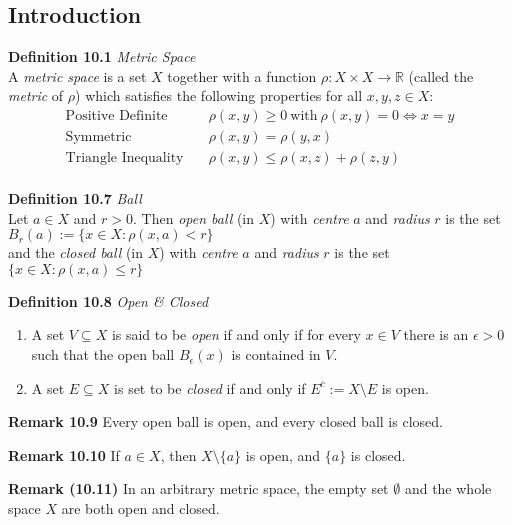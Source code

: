 \documentclass[8pt,landscape]{article}
\begin{document}
\begin{multicols}{3}
\subsection{Introduction}

\textbf{Definition 10.1} \emph{Metric Space} \\
A \emph{metric space} is a set $X$ together with a function
$\rho : X \times X \to \mathbb{R}$ (called the \emph{metric} of $\rho$) which
satisfies the following properties for all $x, y, z \in X$:
\begin{align*}{}
    \text{Positive Definite} \quad & \rho(x, y) \geq 0 \ \text{with} \ \rho(x, y) = 0
    \iff x = y \\
    \text{Symmetric} \quad & \rho(x, y) = \rho(y, x) \\
    \text{Triangle Inequality} \quad & \rho(x, y) \leq \rho(x, z) + \rho(z, y) \\
\end{align*}

\textbf{Definition 10.7} \emph{Ball} \\
Let $a \in X$ and $r > 0$.
Then \emph{open ball} (in $X$) with \emph{centre} $a$ and \emph{radius} $r$ is the set \\
$B_r(a) := \{ x \in X : \rho(x, a) < r \}$ \\
and the \emph{closed ball} (in $X$) with \emph{centre} $a$ and \emph{radius} $r$ is
the set \\
$\{ x \in X : \rho (x, a) \leq r \}$

\textbf{Definition 10.8} \emph{Open \& Closed}
\begin{enumerate}
    \item A set $V \subseteq X$ is said to be \emph{open} if and only if
        for every $x \in V$ there is an $\epsilon > 0$ such that the open ball
        $B_\epsilon (x)$ is contained in $V$.
    \item A set $E \subseteq X$ is set to be \emph{closed} if and only if
        $E^c := X \setminus E$ is open.
\end{enumerate}

\textbf{Remark 10.9}
Every open ball is open, and every closed ball is closed.

\textbf{Remark 10.10}
If $a \in X$, then $X \setminus \{a\}$ is open, and $\{a\}$ is closed.

\textbf{Remark (10.11)}
In an arbitrary metric space, the empty set $\emptyset$ and the whole space $X$
are both open and closed.


\end{multicols}
\end{document}
